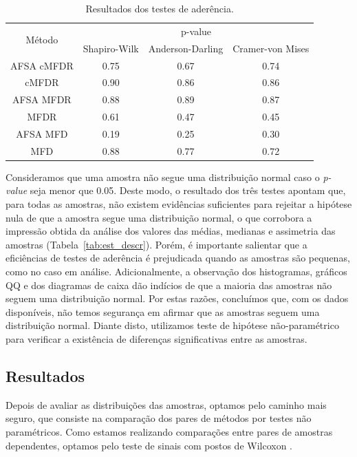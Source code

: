 \documentclass[conference]{IEEEtran}
\begin{document}
\begin{table}[h]
	\centering
	\caption{Resultados dos testes de aderência.}
	\label{tab:aderencia}
	\begin{tabular}{c|ccc}
		\cline{2-4}
		\multirow{2}{*}{Método} & \multicolumn{3}{c}{p-value} \\ 
		\cline{2-4} 
		& Shapiro-Wilk & Anderson-Darling & Cramer-von Mises \\ \hline
		AFSA cMFDR & 0.75 & 0.67 & 0.74 \\
		cMFDR & 0.90 & 0.86 & 0.86 \\
		AFSA MFDR & 0.88 & 0.89 & 0.87 \\
		MFDR & 0.61 & 0.47 & 0.45 \\
		AFSA MFD & 0.19 & 0.25 & 0.30 \\
		MFD & 0.88 & 0.77 & 0.72 \\ \hline
	\end{tabular}
\end{table}

Consideramos que uma amostra não segue uma distribuição normal caso o \textit{p-value} seja menor que 0.05.
Deste modo, o resultado dos três testes apontam que, para todas as amostras, não existem evidências suficientes para rejeitar a hipótese nula de que a amostra segue uma distribuição normal, o que corrobora a impressão obtida da análise dos valores das médias, medianas e assimetria das amostras (Tabela~\ref{tab:est_descr}).
Porém, é importante salientar que a eficiências de testes de aderência é prejudicada quando as amostras são pequenas, como no caso em análise.
Adicionalmente, a observação dos histogramas, gráficos QQ e dos diagramas de caixa dão indícios de que a maioria das amostras não seguem uma distribuição normal.
Por estas razões, concluímos que, com os dados disponíveis, não temos segurança em afirmar que as amostras seguem uma distribuição normal.
Diante disto, utilizamos teste de hipótese não-paramétrico para verificar a existência de diferenças significativas entre as amostras.

\subsection{Resultados}

Depois de avaliar as distribuições das amostras, optamos pelo caminho mais seguro, que consiste na comparação dos pares de métodos por testes não paramétricos. 
Como estamos realizando comparações entre pares de amostras dependentes, optamos pelo teste de sinais com postos de Wilcoxon \cite{wilcoxon1945individual}.
\end{document}
